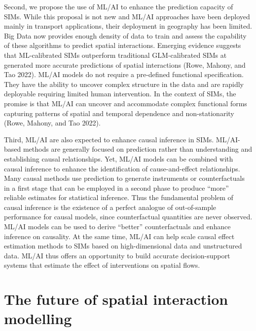 \documentclass[11pt,letterpaper]{article}
\begin{document}
Second, we propose the use of ML/AI to enhance the prediction capacity of SIMs.
While this proposal is not new and ML/AI approaches have been deployed mainly in transport applications, their deployment in geography has been limited.
Big Data now provides enough density of data to train and assess the capability of these algorithms to predict spatial interactions.
Emerging evidence suggests that ML-calibrated SIMs outperform traditional GLM-calibrated SIMs at generated more accurate predictions of spatial interactions (Rowe, Mahony, and Tao 2022).
ML/AI models do not require a pre-defined functional specification.
They have the ability to uncover complex structure in the data and are rapidly deployable requiring limited human intervention.
In the context of SIMs, the promise is that ML/AI can uncover and accommodate complex functional forms capturing patterns of spatial and temporal dependence and non-stationarity (Rowe, Mahony, and Tao 2022).

Third, ML/AI are also expected to enhance causal inference in SIMs.
ML/AI-based methods are generally focused on prediction rather than understanding and establishing causal relationships.
Yet, ML/AI models can be combined with causal inference to enhance the identification of cause-and-effect relationships.
Many causal methods use prediction to generate instruments or counterfactuals in a first stage that can be employed in a second phase to produce ``more'' reliable estimates for statistical inference.
Thus the fundamental problem of causal inference is the existence of a perfect analogue of out-of-sample performance for causal models, since counterfactual quantities are never observed.
ML/AI models can be used to derive ``better'' counterfactuals and enhance inference on causality.
At the same time, ML/AI can help scale causal effect estimation methods to SIMs based on high-dimensional data and unstructured data.
ML/AI thus offers an opportunity to build accurate decision-support systems that estimate the effect of interventions on spatial flows.

\hypertarget{the-future-of-spatial-interaction-modelling}{%
\section{The future of spatial interaction modelling}\label{the-future-of-spatial-interaction-modelling}}
\end{document}
